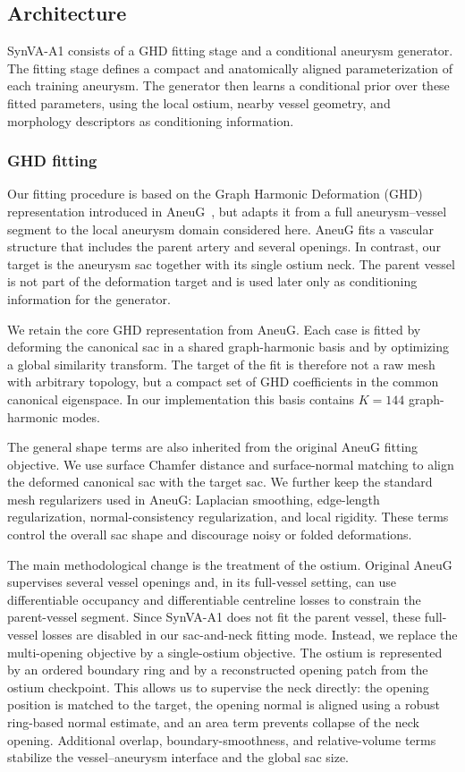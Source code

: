 \subsection{Architecture}

SynVA-A1 consists of a GHD fitting stage and a conditional aneurysm generator.
The fitting stage defines a compact and anatomically aligned parameterization
of each training aneurysm. The generator then learns a conditional prior over
these fitted parameters, using the local ostium, nearby vessel geometry, and
morphology descriptors as conditioning information.

\subsubsection{GHD fitting}

Our fitting procedure is based on the Graph Harmonic Deformation (GHD)
representation introduced in AneuG~\cite{ding2025two}, but adapts it from a
full aneurysm--vessel segment to the local aneurysm domain considered here.
AneuG fits a vascular structure that includes the parent artery and several
openings. In contrast, our target is the aneurysm sac together with its single
ostium neck. The parent vessel is not part of the deformation target and is
used later only as conditioning information for the generator.

We retain the core GHD representation from AneuG. Each case is fitted by
deforming the canonical sac in a shared graph-harmonic basis and by optimizing
a global similarity transform. The target of the fit is therefore not a raw
mesh with arbitrary topology, but a compact set of GHD coefficients in the
common canonical eigenspace. In our implementation this basis contains
$K=144$ graph-harmonic modes.

The general shape terms are also inherited from the original AneuG fitting
objective. We use surface Chamfer distance and surface-normal matching to align
the deformed canonical sac with the target sac. We further keep the standard
mesh regularizers used in AneuG: Laplacian smoothing, edge-length
regularization, normal-consistency regularization, and local rigidity. These
terms control the overall sac shape and discourage noisy or folded
deformations.

The main methodological change is the treatment of the ostium. Original AneuG
supervises several vessel openings and, in its full-vessel setting, can use
differentiable occupancy and differentiable centreline losses to constrain the
parent-vessel segment. Since SynVA-A1 does not fit the parent vessel, these
full-vessel losses are disabled in our sac-and-neck fitting mode. Instead, we
replace the multi-opening objective by a single-ostium objective. The ostium is
represented by an ordered boundary ring and by a reconstructed opening patch
from the ostium checkpoint. This allows us to supervise the neck directly: the
opening position is matched to the target, the opening normal is aligned using
a robust ring-based normal estimate, and an area term prevents collapse of the
neck opening. Additional overlap, boundary-smoothness, and relative-volume
terms stabilize the vessel--aneurysm interface and the global sac size.

